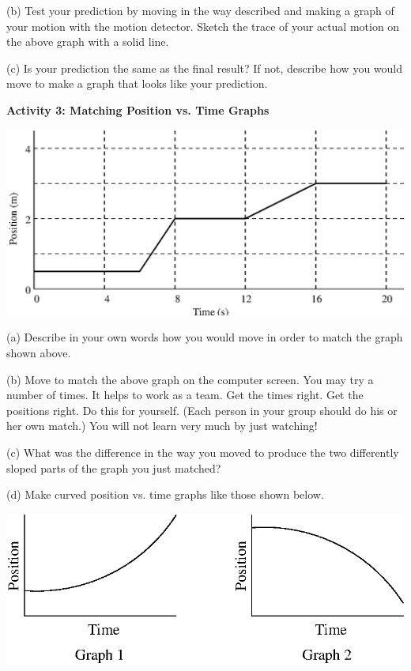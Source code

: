 (b) Test your prediction by moving in the way described and making a graph of
your motion with the motion detector. Sketch the trace of your actual motion
on the above graph with a solid line. 

(c) Is your prediction the same as the final result? If not, describe how you
would move to make a graph that looks like your prediction.
\vspace{20mm}

\textbf{Activity 3: Matching Position vs. Time Graphs}

\vspace{0.3cm}
{\par\centering \includegraphics{position/position_fig3.eps} \par}
\vspace{0.3cm}

(a) Describe in your own words how you would move in order to match the graph
shown above.
\vspace{30mm}

(b) Move to match the above graph on the computer screen. You may try a number
of times. It helps to work as a team. Get the times right. Get the positions
right. Do this for yourself. (Each person in your group should do his or her
own match.) You will not learn very much by just watching!

(c) What was the difference in the way you moved to produce the two differently
sloped parts of the graph you just matched?
\vspace{20mm}

(d) Make curved position vs. time graphs like those shown below.

\vspace{0.3cm}
{\par\centering \includegraphics{position/position_fig4.eps} \par}
\vspace{0.3cm}

